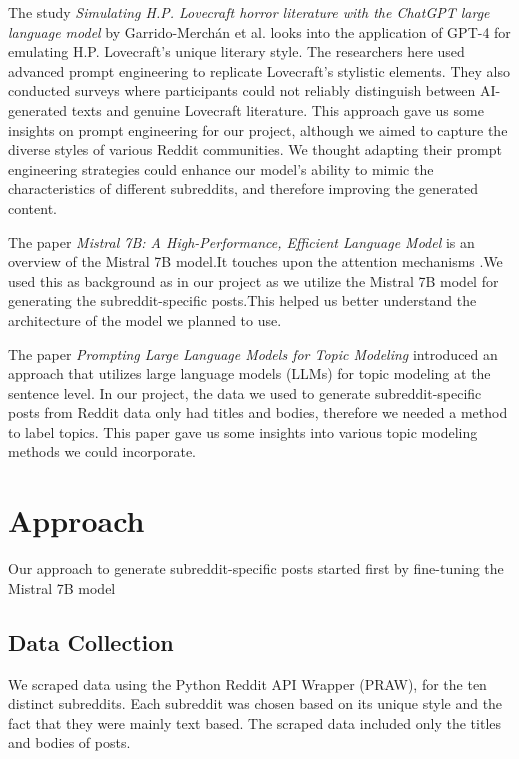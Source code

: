 \documentclass{article}
\begin{document}
The study \textit{Simulating H.P. Lovecraft horror literature with the ChatGPT large language model} by Garrido-Merchán et al. looks into the application of GPT-4 for emulating H.P. Lovecraft's unique literary style. The researchers here used advanced prompt engineering to replicate Lovecraft's stylistic elements. They also conducted surveys where participants could not reliably distinguish between AI-generated texts and genuine Lovecraft literature. This  approach gave us some insights on prompt engineering for our project, although we aimed to capture the diverse styles of various Reddit communities. We thought adapting their prompt engineering strategies could enhance our model's ability to  mimic the characteristics of different subreddits, and therefore improving the generated content.
\vspace{10pt}

The paper \textit{Mistral 7B: A High-Performance, Efficient Language Model} is an overview of the Mistral 7B model.It touches upon the attention mechanisms .We used this as background as in our project as we utilize the Mistral 7B model for generating the subreddit-specific posts.This helped us better understand the architecture of the model we planned to use.

\vspace{10pt}

The paper \textit{Prompting Large Language Models for Topic Modeling} introduced an approach that utilizes large language models (LLMs) for topic modeling at the sentence level. In our project, the data we used to generate subreddit-specific posts from Reddit data only had titles and bodies, therefore we needed a method to label topics. This paper gave us some insights into various topic modeling methods we could incorporate.

\section{Approach}

Our approach to  generate subreddit-specific posts started first by fine-tuning the Mistral 7B model 

\subsection{Data Collection}
We scraped data using the Python Reddit API Wrapper (PRAW), for the ten distinct subreddits. Each subreddit was chosen based on its unique style and the fact that they were mainly text based. The scraped data included only the titles and bodies of posts.
\end{document}
